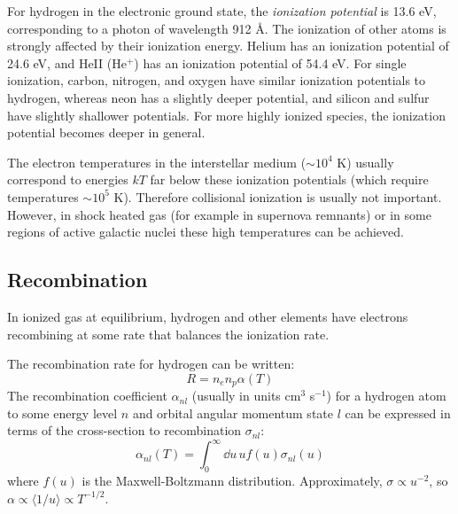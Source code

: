 For hydrogen in the electronic ground state, the {\it ionization
potential} is 13.6 eV, corresponding to a photon of wavelength
912 \AA. The ionization of other atoms is strongly affected by their
ionization energy. Helium has an ionization potential of 24.6 eV, and
HeII (He$^+$) has an ionization potential of 54.4 eV. For single
ionization, carbon, nitrogen, and oxygen have similar ionization
potentials to hydrogen, whereas neon has a slightly deeper potential,
and silicon and sulfur have slightly shallower potentials. For more
highly ionized species, the ionization potential becomes deeper in
general. 

The electron temperatures in the interstellar medium ($\sim 10^4$ K)
usually correspond to energies $kT$ far below these ionization
potentials (which require temperatures $\sim 10^5$ K). Therefore
collisional ionization is usually not important. However, in shock
heated gas (for example in supernova remnants) or in some regions of
active galactic nuclei these high temperatures can be achieved.

\subsection{Recombination}

In ionized gas at equilibrium, hydrogen and other elements have
electrons recombining at some rate that balances the ionization rate.

The recombination rate for hydrogen can be written:
\begin{equation}
R = n_e n_p \alpha(T)
\end{equation}
The recombination coefficient $\alpha_{nl}$ (usually in units
cm$^{3}$ s$^{-1}$) for a hydrogen atom to some energy level $n$ and
orbital angular momentum state $l$ can be expressed in terms of the
cross-section to recombination $\sigma_{nl}$:
\begin{equation}
\label{eq:alpha}
\alpha_{nl}(T) = \int_0^\infty \dd{u}\, u f(u) \sigma_{nl}(u)
\end{equation}
where $f(u)$ is the Maxwell-Boltzmann distribution. Approximately,
$\sigma \propto u^{-2}$, so $\alpha\propto \langle 1/u\rangle \propto
T^{-1/2}$.

